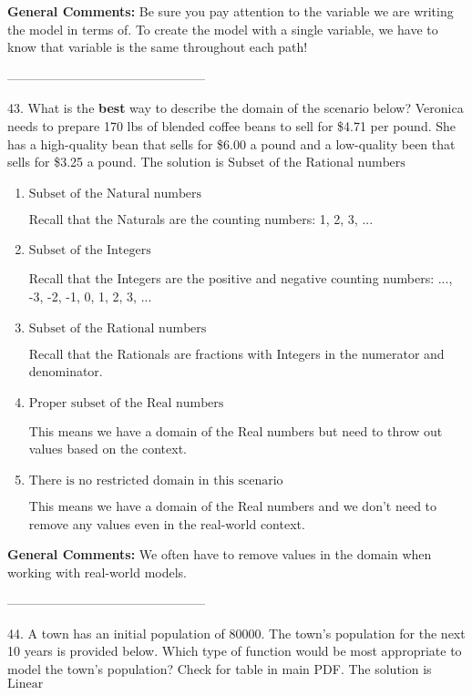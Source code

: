 \documentclass{extbook}[14pt]
\begin{document}
\textbf{General Comments:} Be sure you pay attention to the variable we are writing the model in terms of. To create the model with a single variable, we have to know that variable is the same throughout each path!

-----------------------------------------------

43. What is the \textbf{best} way to describe the domain of the scenario below?
Veronica needs to prepare 170 lbs of blended coffee beans to sell for \$4.71 per pound. She has a high-quality bean that sells for \$6.00 a pound and a low-quality been that sells for \$3.25 a pound. 
The solution is $ \text{Subset of the Rational numbers} $ 

\begin{enumerate}[label=\Alph*.] 
\item $ \text{Subset of the Natural numbers} $ 

 Recall that the Naturals are the counting numbers: 1, 2, 3, ... 
\item $ \text{Subset of the Integers} $ 

 Recall that the Integers are the positive and negative counting numbers: ..., -3, -2, -1, 0, 1, 2, 3, ...  
\item $ \text{Subset of the Rational numbers} $ 

 Recall that the Rationals are fractions with Integers in the numerator and denominator. 
\item $ \text{Proper subset of the Real numbers} $ 

 This means we have a domain of the Real numbers but need to throw out values based on the context. 
\item $ \text{There is no restricted domain in this scenario} $ 

 This means we have a domain of the Real numbers and we don't need to remove any values even in the real-world context. 
\end{enumerate} 
 
\textbf{General Comments:} We often have to remove values in the domain when working with real-world models.

-----------------------------------------------

44. A town has an initial population of 80000. The town's population for the next 10 years is provided below. Which type of function would be most appropriate to model the town's population?
Check for table in main PDF. 
The solution is $ \text{Linear} $ 
\end{document}

